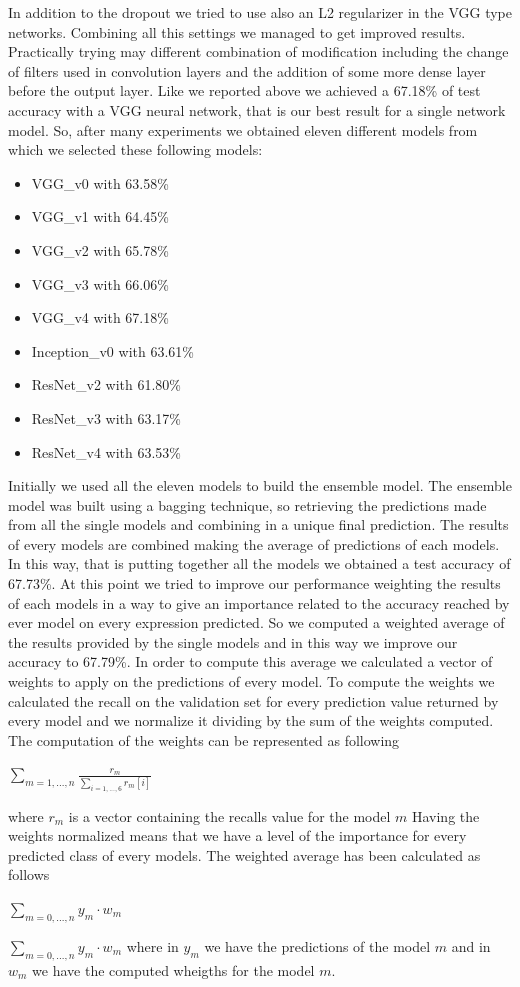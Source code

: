 \documentclass[10pt,twocolumn,letterpaper]{article}
\begin{document}
In addition to the dropout we tried to use also an L2 regularizer in the VGG type networks.
Combining all this settings we managed to get improved results. Practically trying may different combination of modification including
the change of filters used in convolution layers and the addition of some more dense layer before the output layer.
Like we reported above we achieved a 67.18\% of test accuracy with a VGG neural network, that is our best result for a single network model.
So, after many experiments we obtained eleven different models from which we selected these following models:
\begin{itemize}[noitemsep]%
   \item VGG\_v0 with 63.58\%
   \item VGG\_v1 with 64.45\%
   \item VGG\_v2 with 65.78\%
   \item VGG\_v3 with 66.06\%
   \item VGG\_v4 with 67.18\%
   \item Inception\_v0 with 63.61\%
   \item ResNet\_v2 with 61.80\%
   \item ResNet\_v3 with 63.17\%
   \item ResNet\_v4 with 63.53\%
\end{itemize}
Initially we used all the eleven models to build the ensemble model.
The ensemble model was built using a bagging technique, so retrieving the predictions made from all the single models and combining in a unique final prediction.
The results of every models are combined making the average of predictions of each models.
In this way, that is putting together all the models we obtained a test accuracy of 67.73\%.
At this point we tried to improve our performance weighting the results of each models in a way to give an importance related to the accuracy reached by ever model on every expression predicted.
So we computed a weighted average of the results provided by the single models and in this way we improve our accuracy to 67.79\%.
In order to compute this average we calculated a vector of weights to apply on the predictions of every model.
To compute the weights we calculated the recall on the validation set for every prediction value returned by
every model and we normalize it dividing by the sum of the weights computed.
The computation of the weights can be represented as following
\begin{center}
  $\sum_{m=1,...,n} \frac{r_{m}}{\sum_{i=1,...,6} r_{m}[i]}$
  
\end{center}
where $r_m$ is a vector containing the recalls value for the model $m$
Having the weights normalized means that we have a level of the importance for every predicted class of every models.
The weighted average has been calculated as follows
\begin{center}
   $\sum_{m=0,...,n} y_m\cdot w_m$ 
\end{center}
$\sum_{m=0,...,n} y_m\cdot w_m$ 
where in $y_m$ we have the predictions of the model $m$
and in $w_m$ we have the computed wheigths for the model $m$.
\end{document}
